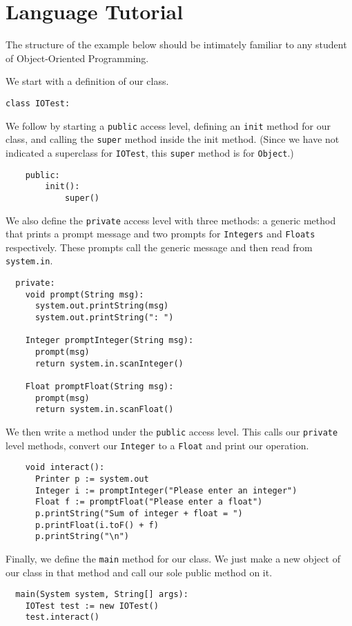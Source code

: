\section{Language Tutorial}

The structure of the example below should be intimately familiar to any student of Object-Oriented Programming. 


We start with a definition of our class.

\begin{lstlisting}
class IOTest:
\end{lstlisting}

We follow by starting a \verb!public! access level, defining an \verb!init! method for our class, and calling the \verb!super! method inside the init method. (Since we have not indicated a superclass for \verb!IOTest!, this \verb!super! method is for \verb!Object!.)

\begin{lstlisting}
    public:
        init():
            super()
\end{lstlisting}

We also define the \verb!private! access level with three methods: a generic method that prints a prompt message and two prompts for \verb!Integers! and \verb!Floats! respectively. These prompts call the generic message and then read from \verb!system.in!.

\begin{lstlisting}
  private:
    void prompt(String msg):
      system.out.printString(msg)
      system.out.printString(": ")

    Integer promptInteger(String msg):
      prompt(msg)
      return system.in.scanInteger()

    Float promptFloat(String msg):
      prompt(msg)
      return system.in.scanFloat()
\end{lstlisting}

We then write a method under the \verb!public! access level. This calls our \verb!private! level methods, convert our \verb!Integer! to a \verb!Float! and print our operation.

\begin{lstlisting}
    void interact():
      Printer p := system.out
      Integer i := promptInteger("Please enter an integer")
      Float f := promptFloat("Please enter a float")
      p.printString("Sum of integer + float = ")
      p.printFloat(i.toF() + f)
      p.printString("\n")
\end{lstlisting}

Finally, we define the \verb!main! method for our class. We just make a new object of our class in that method and call our sole public method on it.


\begin{lstlisting}
  main(System system, String[] args):
    IOTest test := new IOTest()
    test.interact()
\end{lstlisting}